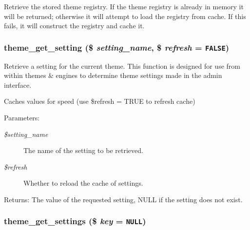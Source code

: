 Retrieve the stored theme registry. If the theme registry is already in memory it will be returned; otherwise it will attempt to load the registry from cache. If this fails, it will construct the registry and cache it. \hypertarget{includes_2theme_8inc_1f46caa33d71c0eb1d6a7018db7162f9}{
\subsubsection[{theme\_\-get\_\-setting}]{\setlength{\rightskip}{0pt plus 5cm}theme\_\-get\_\-setting (\$ {\em setting\_\-name}, \/  \$ {\em refresh} = {\tt FALSE})}}
\label{includes_2theme_8inc_1f46caa33d71c0eb1d6a7018db7162f9}


Retrieve a setting for the current theme. This function is designed for use from within themes \& engines to determine theme settings made in the admin interface.

Caches values for speed (use \$refresh = TRUE to refresh cache)

\begin{Desc}
\item[Parameters:]
\begin{description}
\item[{\em \$setting\_\-name}]The name of the setting to be retrieved.\item[{\em \$refresh}]Whether to reload the cache of settings.\end{description}
\end{Desc}
\begin{Desc}
\item[Returns:]The value of the requested setting, NULL if the setting does not exist. \end{Desc}
\hypertarget{includes_2theme_8inc_c64cf162740d831ad7655df4008b0c3a}{
\subsubsection[{theme\_\-get\_\-settings}]{\setlength{\rightskip}{0pt plus 5cm}theme\_\-get\_\-settings (\$ {\em key} = {\tt NULL})}}
\label{includes_2theme_8inc_c64cf162740d831ad7655df4008b0c3a}


